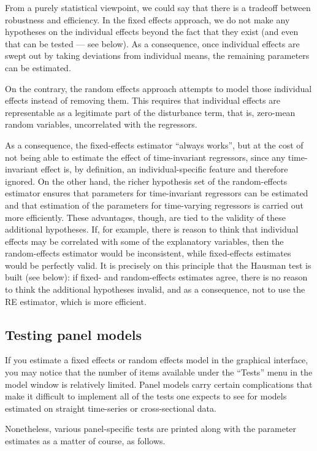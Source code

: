 From a purely statistical viewpoint, we could say that there is a
tradeoff between robustness and efficiency. In the fixed effects
approach, we do not make any hypotheses on the individual effects
beyond the fact that they exist (and even that can be tested --- see
below). As a consequence, once individual effects are swept out by
taking deviations from individual means, the remaining parameters can
be estimated.

On the contrary, the random effects approach attempts to model those
individual effects instead of removing them. This requires that
individual effects are representable as a legitimate part of the
disturbance term, that is, zero-mean random variables, uncorrelated
with the regressors.

As a consequence, the fixed-effects estimator ``always works'', but at
the cost of not being able to estimate the effect of time-invariant
regressors, since any time-invariant effect is, by definition, an
individual-specific feature and therefore ignored. On the other hand,
the richer hypothesis set of the random-effects estimator ensures that
parameters for time-invariant regressors can be estimated and that
estimation of the parameters for time-varying regressors is carried
out more efficiently.  These advantages, though, are tied to the
validity of these additional hypotheses. If, for example, there is
reason to think that individual effects may be correlated with some of
the explanatory variables, then the random-effects estimator would be
inconsistent, while fixed-effects estimates would be perfectly valid.
It is precisely on this principle that the Hausman test is built (see
below): if fixed- and random-effects estimates agree, there is no
reason to think the additional hypotheses invalid, and as a
consequence, not to use the RE estimator, which is more efficient.


\subsection{Testing panel models}
\label{panel-tests}

If you estimate a fixed effects or random effects model in the
graphical interface, you may notice that the number of items available
under the ``Tests'' menu in the model window is relatively limited.
Panel models carry certain complications that make it difficult to
implement all of the tests one expects to see for models estimated on
straight time-series or cross-sectional data.  

Nonetheless, various panel-specific tests are printed along with the
parameter estimates as a matter of course, as follows.

